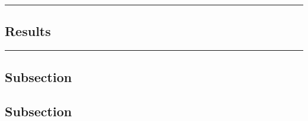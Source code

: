 {\color{gray}\hrule}
\begin{center}
	\section{Results}
	\bigskip
\end{center}
{\color{gray}\hrule}
\begin{multicols}{2}
	\subsection{Subsection}
	\subsection{Subsection}
\end{multicols}



